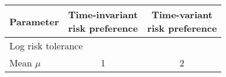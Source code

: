 {
\begin{tabular}{l *{2}{c}}
	\toprule
	\textbf{Parameter} & \thead{Time-invariant\\ risk preference} & \thead{Time-variant\\ risk preference} \\
	\midrule
	\multicolumn{3}{l}{Log risk tolerance}\\
	\hspace{2em} Mean $\mu$ & 1 & 2 
	
\end{tabular}
}